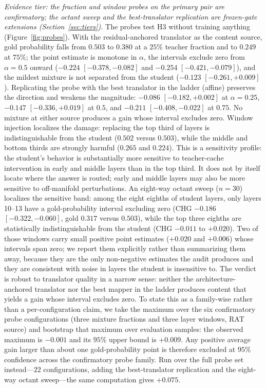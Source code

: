 \documentclass{article} %
\begin{document}
\emph{Evidence tier: the fraction and window probes on the primary pair are
confirmatory; the octant sweep and the best-translator replication are
frozen-gate extensions (Section~\ref{sec:tiers}).}
The probes test H3 without training anything (Figure~\ref{fig:probes}). With the
residual-anchored translator as the content source, gold probability falls from
$0.503$ to $0.380$ at a $25\%$ teacher fraction and to $0.249$ at $75\%$; the
point estimate is monotone in $\alpha$, the intervals exclude zero from
$\alpha{=}0.5$ onward ($-0.224$ $[-0.378, -0.082]$ and $-0.254$
$[-0.421, -0.079]$), and the mildest mixture is not separated from the student
($-0.123$ $[-0.261, +0.009]$). Replicating the probe with the best translator in
the ladder (affine) preserves the direction and weakens the magnitude: $-0.086$
$[-0.182, +0.002]$ at $\alpha{=}0.25$, $-0.147$ $[-0.336, +0.019]$ at $0.5$, and
$-0.211$ $[-0.408, -0.022]$ at $0.75$. No mixture at either source produces a
gain whose interval excludes zero. Window injection localizes the damage:
replacing the top third of layers is indistinguishable from the student
($0.502$ versus $0.503$), while the middle and bottom thirds are strongly
harmful ($0.265$ and $0.224$). This is a sensitivity profile: the student's
behavior is substantially more sensitive to teacher-cache intervention in
early and middle layers than in the top third. It does not by itself locate
where the answer is routed; early and middle layers may also be more sensitive
to off-manifold perturbations. An eight-way octant sweep ($n{=}30$)
localizes the sensitive band: among the eight eighths of student layers, only
layers 10--13 have a gold-probability interval excluding zero (CHG $-0.186$
$[-0.322, -0.060]$, gold $0.317$ versus $0.503$), while the top three eighths
are statistically indistinguishable from the student (CHG $-0.011$ to
$+0.020$). Two of those windows carry small positive point estimates
($+0.020$ and $+0.006$) whose intervals span zero; we report them explicitly
rather than summarizing them away, because they are the only non-negative
estimates the audit produces and they are consistent with noise in layers the
student is insensitive to. The verdict is robust to translator quality in a
narrow sense: neither the architecture-anchored translator nor the best mapper
in the ladder produces content that yields a gain whose interval excludes zero.
To state this as a family-wise rather than a per-configuration claim, we take
the maximum over the six confirmatory probe configurations (three mixture
fractions and three layer windows, RAT source) and bootstrap that maximum over
evaluation samples: the observed maximum is $-0.001$ and its $95\%$ upper bound
is $+0.009$. Any positive average gain larger than about one gold-probability
point is therefore excluded at $95\%$ confidence across the confirmatory probe
family. Run over the full probe set instead---$22$ configurations, adding the
best-translator replication and the eight-way octant sweep---the same
computation gives $+0.075$.
\end{document}
